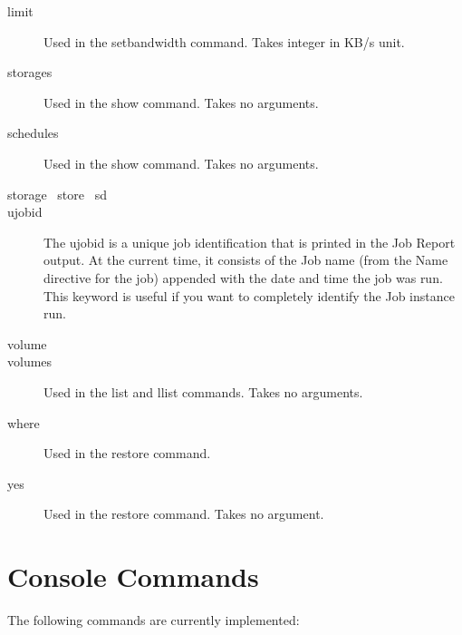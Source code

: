 \begin{description}
\item[limit]
  Used in the setbandwidth command. Takes integer in KB/s unit.
\item [storages]
  Used in the show command. Takes no arguments.
\item [schedules]
  Used in the show command. Takes no arguments.
\item [storage \textbar\ store \textbar\ sd]
\item [ujobid]
  The ujobid is a unique job identification that is printed
  in the Job Report output. At the current time, it consists
  of the Job name (from the Name directive for the job) appended
  with the date and time the job was run. This keyword is useful
  if you want to completely identify the Job instance run.
\item [volume]
\item [volumes]
  Used in the list and llist commands. Takes no arguments.
\item [where]
  Used in the restore command.
\item [yes]
  Used in the restore command. Takes no argument.
\end{description}

\section{Console Commands}
    \label{sec:ConsoleCommands}

The following commands are currently implemented:


